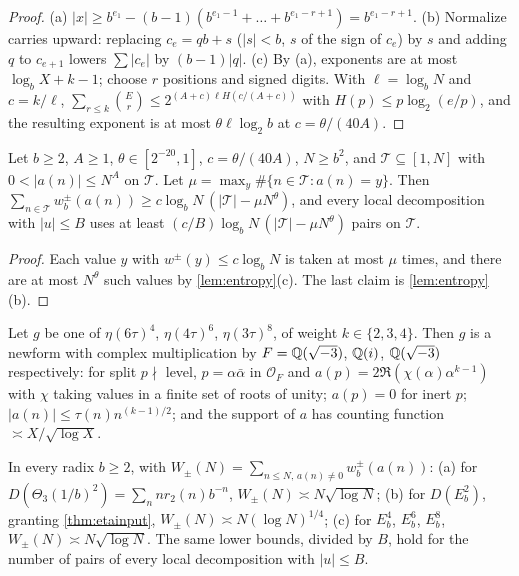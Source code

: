\documentclass[11pt]{article}
\newcommand{\cnt}{\#}
\begin{document}
\begin{proof}
(a) $|x|\ge b^{e_1}-(b-1)(b^{e_1-1}+\dots+b^{e_1-r+1})=b^{e_1-r+1}$. (b) Normalize carries upward:
replacing $c_e=qb+s$ ($|s|<b$, $s$ of the sign of $c_e$) by $s$ and adding $q$ to $c_{e+1}$ lowers
$\sum|c_e|$ by $(b-1)|q|$. (c) By (a), exponents are at most $\log_bX+k-1$; choose $r$ positions
and signed digits. With $\ell=\log_bN$ and $c=k/\ell$, $\sum_{r\le k}\binom Er\le2^{(A+c)\ell H(c/(A+c))}$
with $H(p)\le p\log_2(e/p)$, and the resulting exponent is at most $\theta\ell\log_2b$ at
$c=\theta/(40A)$.
\end{proof}

\begin{theorem}\label{thm:wall}
Let $b\ge2$, $A\ge1$, $\theta\in[2^{-20},1]$, $c=\theta/(40A)$, $N\ge b^2$, and $\mathcal T\subseteq[1,N]$
with $0<|a(n)|\le N^A$ on $\mathcal T$. Let $\mu=\max_y\cnt\{n\in\mathcal T:a(n)=y\}$. Then
$\sum_{n\in\mathcal T}w_b^\pm(a(n))\ge c\log_bN\,(|\mathcal T|-\mu N^\theta)$, and every local
decomposition with $|u|\le B$ uses at least $(c/B)\log_bN\,(|\mathcal T|-\mu N^\theta)$ pairs on
$\mathcal T$.
\end{theorem}

\begin{proof}
Each value $y$ with $w^\pm(y)\le c\log_bN$ is taken at most $\mu$ times, and there are at most $N^\theta$
such values by \cref{lem:entropy}(c). The last claim is \cref{lem:entropy}(b).
\end{proof}

\begin{theorem}\label{thm:cminput}
Let $g$ be one of $\eta(6\tau)^4$, $\eta(4\tau)^6$, $\eta(3\tau)^8$, of weight $k\in\{2,3,4\}$. Then
$g$ is a newform with complex multiplication by $F=\mathbb Q(\sqrt{-3})$, $\mathbb Q(i)$, $\mathbb Q(\sqrt{-3})$
respectively: for split $p\nmid$ level, $p=\alpha\bar\alpha$ in $\mathcal O_F$ and
$a(p)=2\Re(\chi(\alpha)\alpha^{k-1})$ with $\chi$ taking values in a finite set of roots of unity;
$a(p)=0$ for inert $p$; $|a(n)|\le\tau(n)n^{(k-1)/2}$; and the support of $a$ has counting function
$\asymp X/\sqrt{\log X}$.
\end{theorem}

\begin{corollary}\label{cor:wall}
In every radix $b\ge2$, with $W_\pm(N)=\sum_{n\le N,\,a(n)\ne0}w_b^\pm(a(n))$:
\textup{(a)} for $D(\Theta_3(1/b)^2)=\sum_nnr_2(n)b^{-n}$, $W_\pm(N)\asymp N\sqrt{\log N}$;
\textup{(b)} for $D(E_b^2)$, granting \cref{thm:etainput}, $W_\pm(N)\asymp N(\log N)^{1/4}$;
\textup{(c)} for $E_b^4$, $E_b^6$, $E_b^8$, $W_\pm(N)\asymp N\sqrt{\log N}$. The same lower bounds,
divided by $B$, hold for the number of pairs of every local decomposition with $|u|\le B$.
\end{corollary}
\end{document}
